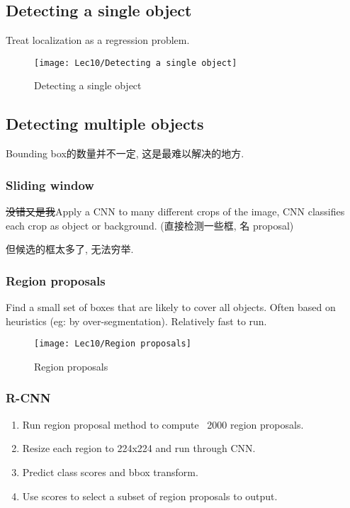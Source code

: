 \subsection{Detecting a single object}
Treat localization as a regression problem. 

\begin{figure}[H]
    \centering
    \texttt{[image: Lec10/Detecting a single object]}
    \caption{Detecting a single object}
\end{figure}

\subsection{Detecting multiple objects}
Bounding box的数量并不一定, 这是最难以解决的地方. 

\subsubsection{Sliding window}
\sout{没错又是我}Apply a CNN to many different crops of the image, CNN classifies each crop as object or background. (直接检测一些框, 名 proposal)

但候选的框太多了, 无法穷举. 

\subsubsection{Region proposals}
Find a small set of boxes that are likely to cover all objects. Often based on heuristics (eg: by over-segmentation). Relatively fast to run.

\begin{figure}[H]
    \centering
    \texttt{[image: Lec10/Region proposals]}
    \caption{Region proposals}
\end{figure}

\subsubsection{R-CNN}
\begin{enumerate}
    \item Run region proposal method to compute ~2000 region proposals. 
    \item Resize each region to 224x224 and run through CNN. 
    \item Predict class scores and bbox transform.
    \item Use scores to select a subset of region proposals to output. 
\end{enumerate}

